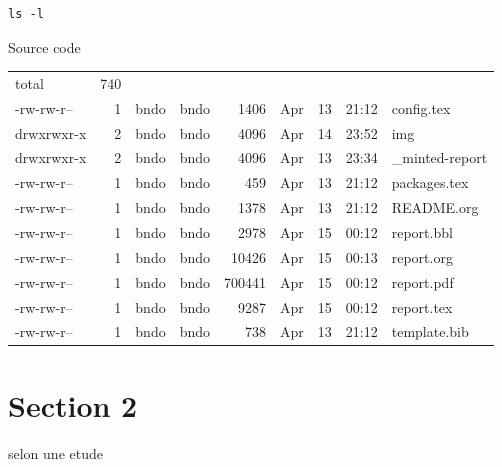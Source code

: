 \documentclass[12pt]{extarticle}
\let\cite\parencite
\begin{document}
\begin{listing}[htbp]
\begin{verbatim}
ls -l
\end{verbatim}
\caption{Source code}
\end{listing}

\begin{center}
\begin{tabular}{lrllrlrrl}
total & 740 &  &  &  &  &  &  & \\
-rw-rw-r-- & 1 & bndo & bndo & 1406 & Apr & 13 & 21:12 & config.tex\\
drwxrwxr-x & 2 & bndo & bndo & 4096 & Apr & 14 & 23:52 & img\\
drwxrwxr-x & 2 & bndo & bndo & 4096 & Apr & 13 & 23:34 & \_minted-report\\
-rw-rw-r-- & 1 & bndo & bndo & 459 & Apr & 13 & 21:12 & packages.tex\\
-rw-rw-r-- & 1 & bndo & bndo & 1378 & Apr & 13 & 21:12 & README.org\\
-rw-rw-r-- & 1 & bndo & bndo & 2978 & Apr & 15 & 00:12 & report.bbl\\
-rw-rw-r-- & 1 & bndo & bndo & 10426 & Apr & 15 & 00:13 & report.org\\
-rw-rw-r-- & 1 & bndo & bndo & 700441 & Apr & 15 & 00:12 & report.pdf\\
-rw-rw-r-- & 1 & bndo & bndo & 9287 & Apr & 15 & 00:12 & report.tex\\
-rw-rw-r-- & 1 & bndo & bndo & 738 & Apr & 13 & 21:12 & template.bib\\
\end{tabular}
\end{center}


\section{Section 2}
\label{sec:org3a06ad6}
\newpage


selon une etude \cite{2021}

\newpage

{}

\printbibliography
\end{document}
